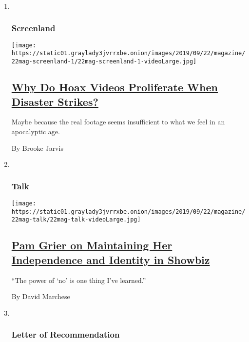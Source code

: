 \begin{enumerate}
\def\labelenumi{\arabic{enumi}.}
\item ~
  \hypertarget{screenland}{%
  \subsubsection{Screenland}\label{screenland}}

  \texttt{[image: https://static01.graylady3jvrrxbe.onion/images/2019/09/22/magazine/22mag-screenland-1/22mag-screenland-1-videoLarge.jpg]}

  \hypertarget{why-do-hoax-videos-proliferate-when-disaster-strikes}{%
  \subsection{\texorpdfstring{\href{/2019/09/19/magazine/why-do-hoax-videos-proliferate-when-disaster-strikes.html}{Why
  Do Hoax Videos Proliferate When Disaster
  Strikes?}}{Why Do Hoax Videos Proliferate When Disaster Strikes?}}\label{why-do-hoax-videos-proliferate-when-disaster-strikes}}

  Maybe because the real footage seems insufficient to what we feel in
  an apocalyptic age.

  By Brooke Jarvis
\item ~
  \hypertarget{talk}{%
  \subsubsection{Talk}\label{talk}}

  \texttt{[image: https://static01.graylady3jvrrxbe.onion/images/2019/09/22/magazine/22mag-talk/22mag-talk-videoLarge.jpg]}

  \hypertarget{pam-grier-on-maintaining-her-independence-and-identity-in-showbiz}{%
  \subsection{\texorpdfstring{\href{/interactive/2019/09/15/magazine/pam-grier-interview.html}{Pam
  Grier on Maintaining Her Independence and Identity in
  Showbiz}}{Pam Grier on Maintaining Her Independence and Identity in Showbiz}}\label{pam-grier-on-maintaining-her-independence-and-identity-in-showbiz}}

  ``The power of `no' is one thing I've learned.''

  By David Marchese
\item ~
  \hypertarget{letter-of-recommendation}{%
  \subsubsection{Letter of
  Recommendation}\label{letter-of-recommendation}}


\end{enumerate}

